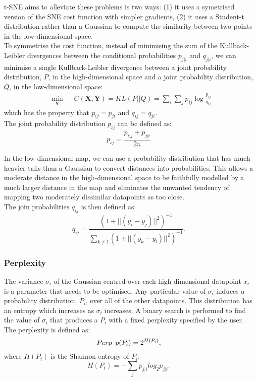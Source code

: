 \documentclass[11pt]{article}
\begin{document}
t-SNE aims to alleviate these problems is two ways: (1) it uses a symetrised version of the SNE cost function with simpler gradients, (2) it uses a Student-t distribution rather than a Gaussian to compute the similarity between two points in the low-dimensional space.
\\
To symmetrise the cost function, instead of minimising the sum of the Kullback-Leibler divergences between the conditional probabilities $p_{j|i}$ and $q_{j|i}$, we can minimise a single Kullback-Leibler divergence between a joint probability distribution, $P$, in the high-dimensional space and a joint probability distribution, $Q$, in the low-dimensional space:
\begin{equation}
\begin{aligned}
& \underset{\mathbf{Y}}{\text{min}}
&& C(\mathbf{X},\mathbf{Y})={\displaystyle KL(P||Q)=\sum _i \sum_j p_{ij}\log {\frac {p_{ij}}{q_{ij}}}}
\end{aligned}
\end{equation}
which has the property that $p_{ij}=p_{ji}$ and $q_{ij}=q_{ji}$.
\\
The joint probability distribution $p_{ij}$ can be defined as:
\begin{equation}
p_{ij}=\frac{p_{i|j}+p_{j|i}}{2n}
\end{equation}

In the low-dimensional map, we can use a probability distribution that has much heavier tails than a Gaussian to convert distances into probabilities. This allows a moderate distance in the high-dimensional space to be faithfully modelled by a much larger distance in the map and eliminates the unwanted tendency of mapping two moderately dissimilar datapoints as too close.
\\
The join probabilities $q_{ij}$ is then defined as:
\begin{equation}
q_{ij}=\frac{(1+||(y_i - y_j) ||^2)^{-1}}{\sum_{k \neq l} (1+|| (y_k - y_l )||^2 )^{-1}}.
\end{equation}

\subsubsection{Perplexity}
The variance $\sigma_i$ of the Gaussian centred over each high-dimensional datapoint $x_i$ is a parameter that needs to be optimised. Any particular value of $\sigma_i$ induces a probability distribution, $P_i$, over all of the other datapoints. This distribution has an entropy which increases as $\sigma_i$ increases. A binary search is performed to find the value of $\sigma_i$ that produces a $P_i$ with a fixed perplexity specified by the user.
The perplexity is defined as:
\begin{equation}
Perp \enskip p(P_i) = 2 ^{H(P_i)},
\end{equation}
where $H(P_i)$ is the Shannon entropy of $P_i$:
\begin{equation}
H(P_i)= - \sum_j p_{j|i} log_2 p_{j|i}.
\end{equation}
\end{document}
